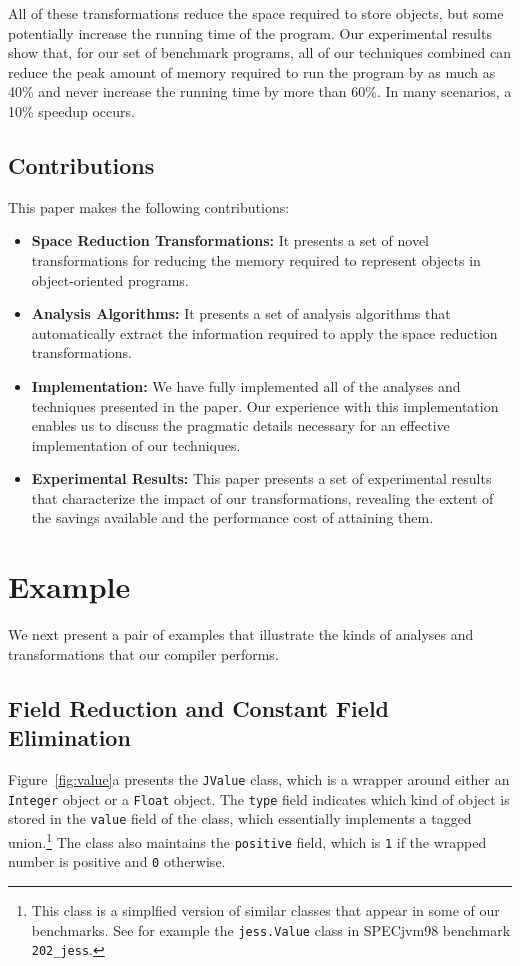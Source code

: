 \documentclass[oribibl]{llncs}
\begin{document}
All of these transformations reduce the space required to store
objects, but some potentially increase the running time of the program.
Our experimental results show that, for our set of benchmark
programs, all of our techniques combined can reduce the peak amount of memory
required to run the program by as much as 40\% and never increase the
running time by more than 60\%.  In many scenarios, a 10\% speedup occurs.

\subsection{Contributions}

This paper makes the following contributions:
\begin{itemize}
\item {\bf Space Reduction Transformations:} It presents a set
of novel transformations for reducing the memory required to 
represent objects in object-oriented programs.

\item {\bf Analysis Algorithms:} It presents a set of 
analysis algorithms that automatically extract the 
information required to apply the space reduction 
transformations.

\item {\bf Implementation:} We have fully 
implemented all of the analyses and techniques 
presented in the paper. Our experience with this
implementation enables us to discuss the pragmatic
details necessary for an effective implementation 
of our techniques. 

\item {\bf Experimental Results:} This paper presents a set
of experimental results that characterize the impact
of our transformations, revealing the extent of the
savings available and the performance cost of attaining them.
\end{itemize}
%
\section{Example}
%
We next present a pair of examples that illustrate the kinds of 
analyses and transformations that our compiler performs.
%
\subsection{Field Reduction and Constant Field Elimination}
%
Figure~\ref{fig:value}a presents the {\tt JValue} class, which is 
a wrapper around either an {\tt Integer} object or a {\tt Float}
object. The {\tt type} field indicates which kind of object
is stored in the {\tt value} field of the class, 
which essentially implements a tagged 
union.\footnote{This class is a simplfied version of similar
classes that appear in some of our benchmarks.
See for example the {\tt jess.Value} class in SPECjvm98 benchmark
{\tt 202\_jess}.} 
The class also maintains the {\tt positive} field, which is
{\tt 1} if the wrapped number is positive and {\tt 0} otherwise. 
\end{document}
